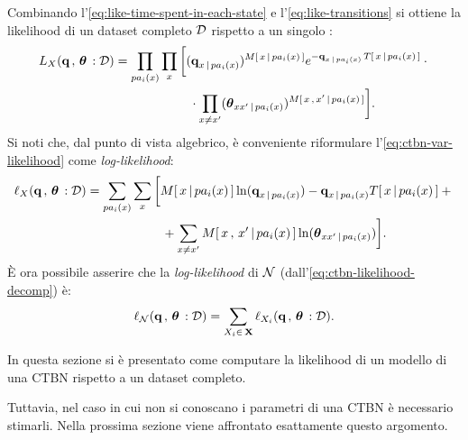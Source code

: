 \normalsize
Combinando l'\autoref{eq:like-time-spent-in-each-state} e l'\autoref{eq:like-transitions} si ottiene la likelihood di un dataset completo $\mathcal{D}$ rispetto a un singolo \mprocess*{} \cond*{}:
\footnotesize
\begin{align}\label{eq:ctbn-var-likelihood}
L_{\setel{X}}(\param{q}\,,\,\param{$\theta$}\,:\conceptsym{D}) &= \prod_{pa_i(\setel{x})}\prod_{\setel{x}} \bigg[ (\param{q}_{\setel{x}\,\arrowvert\,pa_i(\setel{x})})^{\mstat{x\,\arrowvert\,pa_i(\setel{x})}}e^{-\param{q}_{\setel{x}\,\arrowvert\,pa_i(\setel{x})}\,\tstat{x\,\arrowvert\,pa_i(\setel{x})}} \cdot \bigg.\nonumber\\
& \qquad \bigg.{} \qquad \qquad \cdot \prod_{\setel{x}\neq \setel{x}^{\prime}}(\param{$\theta$}_{\setel{x}\setel{x}^{\prime}\,\arrowvert\,pa_i(\setel{x})})^{\mstat[x]{\setel{x}^{\prime}\,\arrowvert\,pa_i(\setel{x})}} \bigg] \text{\normalsize .}
\end{align}
\normalsize
Si noti che, dal punto di vista algebrico, è conveniente riformulare l'\autoref{eq:ctbn-var-likelihood} come \emph{log-likelihood}:
\footnotesize
\begin{align}\label{eq:ctbn-var-log-likelihood}
\ell_{\setel{X}}(\param{q}\,,\,\param{$\theta$}\,:\conceptsym{D}) &= \sum_{pa_i(\setel{x})}\sum_{\setel{x}} \bigg[ \mstat{x\,\arrowvert\,pa_i(\setel{x})}\ln(\param{q}_{x\,\arrowvert\,pa_i(\setel{x})})- \param{q}_{\setel{x}\,\arrowvert\,pa_i(\setel{x})}\tstat{\setel{x}\,\arrowvert\,pa_i(\setel{x})} + \bigg.\nonumber\\
& \qquad \bigg.{} \qquad \qquad + \sum_{\setel{x}\neq \setel{x}^{\prime}}\mstat[x]{\setel{x}^{\prime}\,\arrowvert\,pa_i(\setel{x})}\ln(\param{$\theta$}_{\setel{x}\setel{x}^{\prime}\,\arrowvert\,pa_i(\setel{x})}) \bigg] \text{\normalsize .}
\end{align}
\normalsize
\`E ora possibile asserire che la \emph{log-likelihood} di $\mathcal{N}$ (dall'\autoref{eq:ctbn-likelihood-decomp}) è:
\begin{equation}\label{eq:ctbn-log-likelihood}
\ell_{\mathcal{N}}(\boldsymbol{\textbf{\text{q}}}\,,\,\boldsymbol{\textbf{\text{$\theta$}}}\,:\mathcal{D})=\sum_{\mathnormal{X}_i \in \, \mathbf{X}} \ell_{\mathnormal{X}_i}(\boldsymbol{\textbf{\text{q}}}\,,\,\boldsymbol{\textbf{\text{$\theta$}}}\,:\mathcal{D}) \text{.}
\end{equation}

In questa sezione si è presentato come computare la likelihood di un modello di una \acs{CTBN} rispetto a un dataset completo.

Tuttavia, nel caso in cui non si conoscano i parametri di una \acs{CTBN} è necessario stimarli. Nella prossima sezione viene affrontato esattamente questo argomento.

